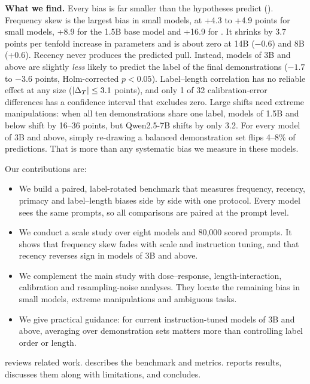 {\bf What we find.} Every bias is far smaller than the hypotheses predict (). Frequency skew is the largest bias in small models, at +4.3 to +4.9 points for small \qwen models, +8.9 for the 1.5B base model and +16.9 for \llamaone. It shrinks by 3.7 points per tenfold increase in parameters and is about zero at 14B ($-0.6$) and 8B (+0.6). Recency never produces the predicted pull. Instead, models of 3B and above are slightly \emph{less} likely to predict the label of the final demonstrations ($-1.7$ to $-3.6$ points, Holm-corrected $p<0.05$). Label--length correlation has no reliable effect at any size ($|\Delta_T|\le3.1$ points), and only 1 of 32 calibration-error differences has a confidence interval that excludes zero. Large shifts need extreme manipulations: when all ten demonstrations share one label, models of 1.5B and below shift by 16--36 points, but Qwen2.5-7B shifts by only 3.2. For every model of 3B and above, simply re-drawing a balanced demonstration set flips 4--8\% of predictions. That is more than any systematic bias we measure in these models.

Our contributions are:
\begin{itemize}[leftmargin=*,itemsep=0pt,topsep=0pt]
    \item We build a paired, label-rotated benchmark that measures frequency, recency, primacy and label--length biases side by side with one protocol. Every model sees the same prompts, so all comparisons are paired at the prompt level.
    \item We conduct a scale study over eight models and 80,000 scored prompts. It shows that frequency skew fades with scale and instruction tuning, and that recency reverses sign in models of 3B and above.
    \item We complement the main study with dose--response, length-interaction, calibration and resampling-noise analyses. They locate the remaining bias in small models, extreme manipulations and ambiguous tasks.
    \item We give practical guidance: for current instruction-tuned models of 3B and above, averaging over demonstration sets matters more than controlling label order or length.
\end{itemize}

 reviews related work.  describes the benchmark and metrics.  reports results,  discusses them along with limitations, and  concludes.
